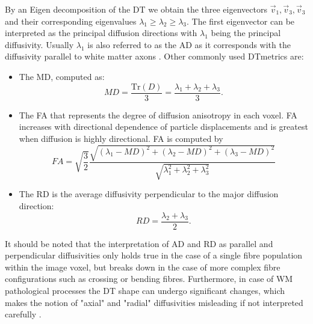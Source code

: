 By an Eigen decomposition of the {\gls{DT}} we obtain the three eigenvectors $\vec{v}_1, \vec{v}_3, \vec{v}_3$ and their corresponding eigenvalues $\lambda_1\ge\lambda_2\ge\lambda_3$. The first eigenvector can be interpreted as the principal diffusion directions with $\lambda_1$ being the principal diffusivity. Usually $\lambda_1$ is also referred to as the {\gls{AD}} as it corresponds with the diffusivity parallel to white matter axons \citep{Basser:1996}. Other commonly used {\gls{DT}}metrics are:
\begin{itemize}
	\item The {\gls{MD}}, computed as:
	\begin{equation}
		MD = \frac{\mbox{Tr}(D)}{3} = \frac{\lambda_1 + \lambda_2 +\lambda_3}{3}.
	\end{equation}
	\item The {\gls{FA}} that represents the degree of diffusion anisotropy in each voxel.  {\gls{FA}} increases
	with directional dependence of particle displacements and is greatest when diffusion is highly directional.  {\gls{FA}} is computed by
	\begin{equation}
		FA = \sqrt{\frac{3}{2}}\frac{\sqrt{(\lambda_1-MD)^2+(\lambda_2-MD)^2+(\lambda_3-MD)^2}}{\sqrt{\lambda_1^2+\lambda_2^2+\lambda_3^2}}
	\end{equation}
	\item The {\gls{RD}} is the average diffusivity perpendicular to the major diffusion direction:
	\begin{equation}
		RD = \frac{\lambda_2 + \lambda_3}{2}.
	\end{equation}
\end{itemize}
It should be noted that the interpretation of \gls{AD} and \gls{RD} as parallel and perpendicular diffusivities only holds true in the case of a single fibre population within the image voxel, but breaks down in the case of more complex fibre configurations such as crossing or bending fibres. Furthermore, in case of WM  pathological processes the DT shape can undergo significant changes, which makes the notion of  "axial" and "radial" diffusivities misleading if not interpreted carefully \citep{Wheeler-Kingshott:inpress}. 

